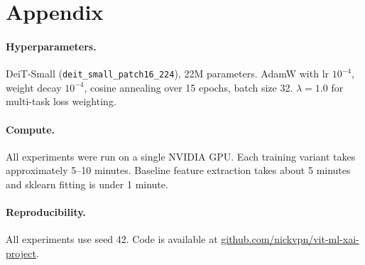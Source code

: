 \documentclass{article}
\begin{document}
\section*{Appendix}

\paragraph{Hyperparameters.}
DeiT-Small (\texttt{deit\_small\_patch16\_224}), 22M parameters. AdamW with lr $10^{-4}$, weight decay $10^{-4}$, cosine annealing over 15 epochs, batch size 32. $\lambda = 1.0$ for multi-task loss weighting.

\paragraph{Compute.}
All experiments were run on a single NVIDIA GPU. Each training variant takes approximately 5--10 minutes. Baseline feature extraction takes about 5 minutes and sklearn fitting is under 1 minute.

\paragraph{Reproducibility.}
All experiments use seed 42. Code is available at \href{https://github.com/nickvpn/vit-ml-xai-project}{github.com/nickvpn/vit-ml-xai-project}.
\end{document}
